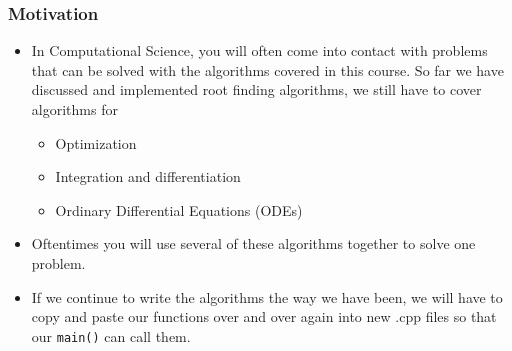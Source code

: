 \documentclass{if-beamer}
\begin{document}
\begin{frame}
	\frametitle{Motivation}
	\begin{itemize}
		\item In Computational Science, you will often come into contact with problems that can be solved with the algorithms covered in this course. So far we have discussed and implemented root finding algorithms, we still have to cover algorithms for \\\vspace{0.2cm}
		\begin{itemize}
			\item Optimization
			\item Integration and differentiation
			\item Ordinary Differential Equations (ODEs) \\\vspace{0.2cm}
		\end{itemize}	
		\item Oftentimes you will use several of these algorithms together to solve one problem. \\\vspace{0.2cm}
		\item If we continue to write the algorithms the way we have been, we will have to copy and paste our functions over and over again into new .cpp files so that our \texttt{main()} can call them. \\\vspace{0.2cm}
	\end{itemize}
\end{frame}
\end{document}
